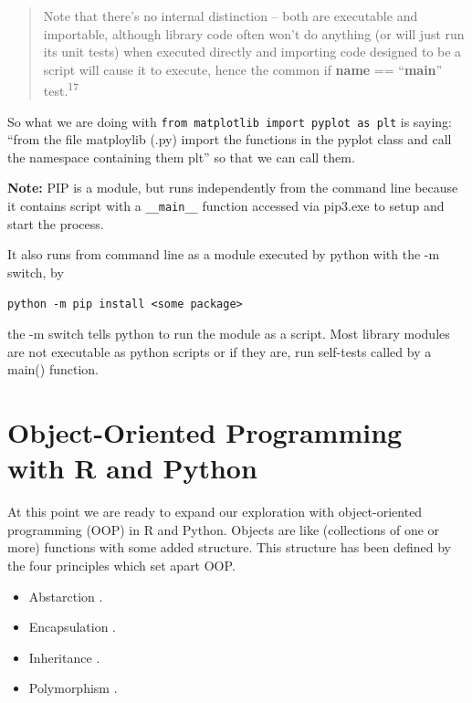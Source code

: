 \documentclass[]{book}
\providecommand{\tightlist}{%
  \setlength{\itemsep}{0pt}\setlength{\parskip}{0pt}}
\theoremstyle{definition}
\theoremstyle{definition}
\theoremstyle{definition}
\theoremstyle{remark}
\begin{document}
\begin{quote}
Note that there's no internal distinction -- both are executable and
importable, although library code often won't do anything (or will just
run its unit tests) when executed directly and importing code designed
to be a script will cause it to execute, hence the common if
\textbf{name} == ``\textbf{main}'' test.\textsuperscript{17}
\end{quote}

So what we are doing with
\texttt{from\ matplotlib\ import\ pyplot\ as\ plt} is saying: ``from the
file matploylib (.py)  import the
functions in the pyplot class and call the namespace containing them
plt'' so that we can call them.

\textbf{Note:} PIP  is a module, but runs independently from
the command line because it contains script with a \texttt{\_\_main\_\_}
function accessed via pip3.exe to setup and start the process.

It also runs from command line as a module executed by python with the
-m switch, by

\begin{verbatim}
python -m pip install <some package>
\end{verbatim}

the -m switch  tells python to run the module as a
script. Most library modules are not executable as python scripts or if
they are, run self-tests called by a main() function.

\chapter{Object-Oriented Programming with R and
Python}\label{object-oriented-programming-with-r-and-python}

At this point we are ready to expand our exploration with
object-oriented programming (OOP) in R and Python. Objects are like
(collections of one or more) functions with some added structure. This
structure has been defined by the four principles which set apart OOP.

\begin{itemize}
\tightlist
\item
  Abstarction .
\item
  Encapsulation .
\item
  Inheritance .
\item
  Polymorphism .
\end{itemize}
\end{document}
